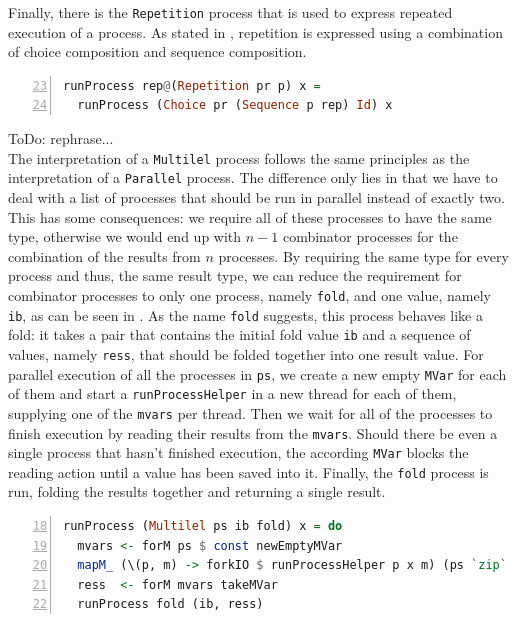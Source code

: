 Finally, there is the \texttt{Repetition} process that is used to express repeated execution of a process. As stated in , repetition is expressed using a combination of choice composition and sequence composition.
\begin{lstlisting}[language=Haskell,caption=Implementation of the interpreter for \texttt{Repetition} processes.,numbers=left,frame=bt,firstnumber=23]
runProcess rep@(Repetition pr p) x =
  runProcess (Choice pr (Sequence p rep) Id) x
\end{lstlisting}


ToDo: rephrase...\\
The interpretation of a \texttt{Multilel} process follows the same principles as the interpretation of a \texttt{Parallel} process. The difference only lies in that we have to deal with a list of processes that should be run in parallel instead of exactly two. This has some consequences: we require all of these processes to have the same type, otherwise we would end up with $n-1$ combinator processes for the combination of the results from $n$ processes. By requiring the same type for every process and thus, the same result type, we can reduce the requirement for combinator processes to only one process, namely \texttt{fold}, and one value, namely \texttt{ib}, as can be seen in . As the name \texttt{fold} suggests, this process behaves like a fold: it takes a pair that contains the initial fold value \texttt{ib} and a sequence of values, namely \texttt{ress}, that should be folded together into one result value. For parallel execution of all the processes in \texttt{ps}, we create a new empty \texttt{MVar} for each of them and start a \texttt{runProcessHelper} in a new thread for each of them, supplying one of the \texttt{mvars} per thread. Then we wait for all of the processes to finish execution by reading their results from the \texttt{mvars}. Should there be even a single process that hasn't finished execution, the according \texttt{MVar} blocks the reading action until a value has been saved into it. Finally, the \texttt{fold} process is run, folding the results together and returning a single result.
\begin{lstlisting}[language=Haskell,caption=Implementation of the interpreter for \texttt{Multilel} processes.,label=lst:local_runprocess_multilel,numbers=left,frame=bt,firstnumber=18]
runProcess (Multilel ps ib fold) x = do
  mvars <- forM ps $ const newEmptyMVar
  mapM_ (\(p, m) -> forkIO $ runProcessHelper p x m) (ps `zip` mvars)
  ress  <- forM mvars takeMVar
  runProcess fold (ib, ress)
\end{lstlisting}

